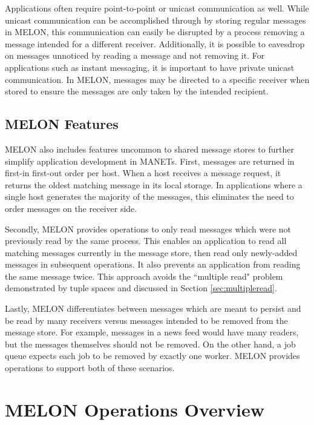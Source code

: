 Applications often require point-to-point or unicast communication as well. While unicast communication can be accomplished through by storing regular messages in MELON, this communication can easily be disrupted by a process removing a message intended for a different receiver. Additionally, it is possible to eavesdrop on messages unnoticed by reading a message and not removing it. For applications such as instant messaging, it is important to have private unicast communication. In MELON, messages may be directed to a specific receiver when stored to ensure the messages are only taken by the intended recipient.

\subsection{MELON Features}

MELON also includes features uncommon to shared message stores to further simplify application development in MANETs. First, messages are returned in first-in first-out order per host. When a host receives a message request, it returns the oldest matching message in its local storage. In applications where a single host generates the majority of the messages, this eliminates the need to order messages on the receiver side.

Secondly, MELON provides operations to only read messages which were not previously read by the same process. This enables an application to read all matching messages currently in the message store, then read only newly-added messages in subsequent operations. It also prevents an application from reading the same message twice. This approach avoids the ``multiple read" problem demonstrated by tuple spaces and discussed in Section \ref{sec:multipleread}.

Lastly, MELON differentiates between messages which are meant to persist and be read by many receivers versus messages intended to be removed from the message store. For example, messages in a news feed would have many readers, but the messages themselves should not be removed. On the other hand, a job queue expects each job to be removed by exactly one worker. MELON provides operations to support both of these scenarios.

\section{MELON Operations Overview}

